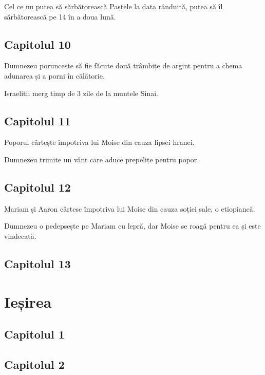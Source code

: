 \documentclass[12pt,a4paper]{article}
\begin{document}
Cel ce nu putea să sărbătorească Paștele la data rânduită, putea să îl sărbătorească pe 14 în a doua lună.

\subsection{Capitolul 10}

Dumnezeu poruncește să fie făcute două trâmbițe de argint pentru a chema adunarea și a porni în călătorie.

Israelitii merg timp de 3 zile de la muntele Sinai.

\subsection{Capitolul 11}

Poporul cârtește împotriva lui Moise din cauza lipsei hranei.

Dumnezeu trimite un vânt care aduce prepelițe pentru popor.

\subsection{Capitolul 12}

Mariam și Aaron cârtesc împotriva lui Moise din cauza soției sale, o etiopiancă.

Dumnezeu o pedepsește pe Mariam cu lepră, dar Moise se roagă pentru ea și este vindecată.

\subsection{Capitolul 13}














\section{Ieșirea}

\subsection{Capitolul 1}

\subsection{Capitolul 2}
\end{document}
